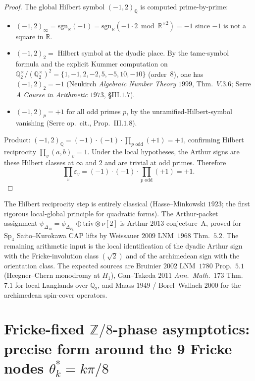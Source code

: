 \begin{proof}
The global Hilbert symbol
$(-1, 2)_{\mathbb Q}$ is computed prime-by-prime:
\begin{itemize}
\item $(-1, 2)_\infty = \mathrm{sgn}_{\mathbb R}(-1) =
\mathrm{sgn}_{\mathbb R}(-1\cdot 2 \bmod \mathbb R^{\times 2})
= -1$ since $-1$ is not a square in $\mathbb R$.
\item $(-1, 2)_2 = $ Hilbert symbol at the dyadic place. By
the tame-symbol formula and the explicit Kummer
computation on $\mathbb Q_2^{\times}/(\mathbb Q_2^\times)^{2}
= \{1, -1, 2, -2, 5, -5, 10, -10\}$ (order~$8$), one has
$(-1, 2)_2 = -1$ (Neukirch \emph{Algebraic Number Theory}
$1999$, Thm.~$V.3.6$; Serre \emph{A Course in Arithmetic}
$1973$, §III.$1.7$).
\item $(-1, 2)_p = +1$ for all odd primes $p$, by the
unramified-Hilbert-symbol vanishing
(Serre op.\ cit., Prop.~III.$1.8$).
\end{itemize}
Product: $(-1, 2)_\mathbb Q = (-1)\cdot(-1)\cdot\prod_{p \text{ odd}}
(+1) = +1$, confirming Hilbert reciprocity
$\prod_v (a, b)_v = 1$.
Under the local hypotheses, the Arthur signs are these Hilbert
classes at $\infty$ and $2$ and are trivial at odd primes. Therefore
\[
\prod_v\varepsilon_v
=(-1)\cdot(-1)\cdot\prod_{p\text{ odd}}(+1)=+1.
\]
\end{proof}

\begin{remark}
\label{rem:stqp-arthur-scope}
The Hilbert reciprocity step is entirely classical
(Hasse--Minkowski $1923$; the first rigorous local-global
principle for quadratic forms). The Arthur-packet assignment
$\psi_{\Delta_{10}} = \phi_{\Delta_{E_6}} \oplus \mathrm{triv}
\otimes \nu[2]$ is Arthur $2013$ conjecture~A, proved for
$\mathrm{Sp}_4$ Saito--Kurokawa CAP lifts by Weissauer $2009$
LNM~$1968$ Thm.~$5.2$. The remaining arithmetic input is the
local identification of the dyadic Arthur sign with the
Fricke-involution class $(\sqrt 2)$ and of the archimedean sign
with the orientation class. The expected sources are Bruinier
$2002$ LNM~$1780$ Prop.~$5.1$ (Heegner--Chern monodromy at $H_1$),
Gan--Takeda $2011$ \emph{Ann.~Math.}~$173$ Thm.~$7.1$ for local
Langlands over $\mathbb Q_2$, and Maass $1949$ / Borel--Wallach
$2000$ for the archimedean spin-cover operators.
\end{remark}

\section{Fricke-fixed $\mathbb Z/8$-phase asymptotics: precise form
around the 9 Fricke nodes $\theta^*_k = k\pi/8$}
\label{sec:stqp-fricke-z8-phase-asymptotics}

